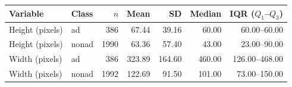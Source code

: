 \begin{tabular}{llrrrrr}
\toprule
Variable & Class & $n$ & Mean & SD & Median & IQR ($Q_1$--$Q_3$)
\\
\midrule
Height (pixels) & ad & 386 & 67.44 & 39.16 & 60.00 & 60.00--60.00
\\
Height (pixels) & nonad & 1990 & 63.36 & 57.40 & 43.00 & 23.00--90.00
\\
Width (pixels) & ad & 386 & 323.89 & 164.60 & 460.00 & 126.00--468.00
\\
Width (pixels) & nonad & 1992 & 122.69 & 91.50 & 101.00 & 73.00--150.00
\\
\bottomrule
\end{tabular}
